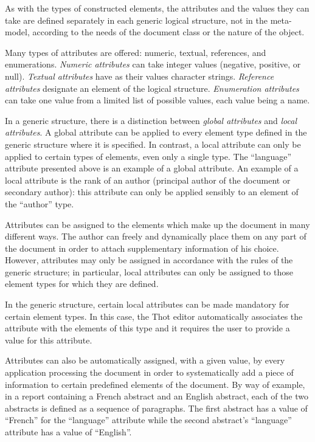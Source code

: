 As with the types of constructed elements, the attributes and the
values they can take are defined separately in each generic logical
structure, not in the meta-model, according to the needs of the
document class or the nature of the object.

Many types of attributes are offered: numeric, textual, references,
and enumerations.  {\em Numeric attributes} can take integer values
(negative, positive, or null).  {\em Textual attributes} have as their
values character strings.  {\em Reference attributes} designate an
element of the logical structure.  {\em Enumeration attributes} can
take one value from a limited list of possible values, each value
being a name.

In a generic structure, there is a distinction between {\em global
attributes} and {\em local attributes}.  A global attribute can be
applied to every element type defined in the generic structure where
it is specified.  In contrast, a local attribute can only be applied
to certain types of elements, even only a single type.  The
``language'' attribute presented above is an example of a global
attribute.  An example of a local attribute is the rank of an author
(principal author of the document or secondary author): this attribute
can only be applied sensibly to an element of the ``author'' type.

Attributes can be assigned to the elements which make up the document
in many different ways.  The author can freely and dynamically place
them on any part of the document in order to attach 
supplementary information of his choice.  However, attributes may only
be assigned in accordance with the rules of the generic structure; in
particular, local attributes can only be assigned to those element
types for which they are defined.

In the generic structure, certain local attributes can be made
mandatory for certain element types.  In this case, the Thot editor
automatically associates the attribute with the elements of this type
and it requires the user to provide a value for this attribute.

Attributes can also be automatically assigned, with a given value, by
every application processing the document in order to systematically
add a piece of information to certain predefined elements of the
document.  By way of example, in a report containing a French abstract
and an English abstract, each of the two abstracts is defined as a
sequence of paragraphs.  The first abstract has a value of ``French''
for the ``language'' attribute while the second abstract's
``language'' attribute has a value of ``English''.

